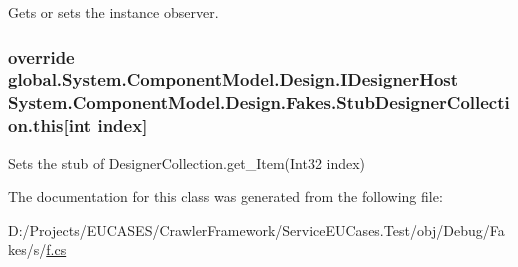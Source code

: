 Gets or sets the instance observer.

\hypertarget{class_system_1_1_component_model_1_1_design_1_1_fakes_1_1_stub_designer_collection_a33fd911e968d5dd075f0dd6462263aaa}{
\subsubsection[{this[int index]}]{\setlength{\rightskip}{0pt plus 5cm}override global.\-System.\-Component\-Model.\-Design.\-I\-Designer\-Host System.\-Component\-Model.\-Design.\-Fakes.\-Stub\-Designer\-Collection.\-this\mbox{[}int {\bf index}\mbox{]}\hspace{0.3cm}{\ttfamily [get]}}}\label{class_system_1_1_component_model_1_1_design_1_1_fakes_1_1_stub_designer_collection_a33fd911e968d5dd075f0dd6462263aaa}


Sets the stub of Designer\-Collection.\-get\-\_\-\-Item(\-Int32 index)



The documentation for this class was generated from the following file\-:\begin{DoxyCompactItemize}
\item 
D\-:/\-Projects/\-E\-U\-C\-A\-S\-E\-S/\-Crawler\-Framework/\-Service\-E\-U\-Cases.\-Test/obj/\-Debug/\-Fakes/s/\hyperlink{s_2f_8cs}{f.\-cs}\end{DoxyCompactItemize}
